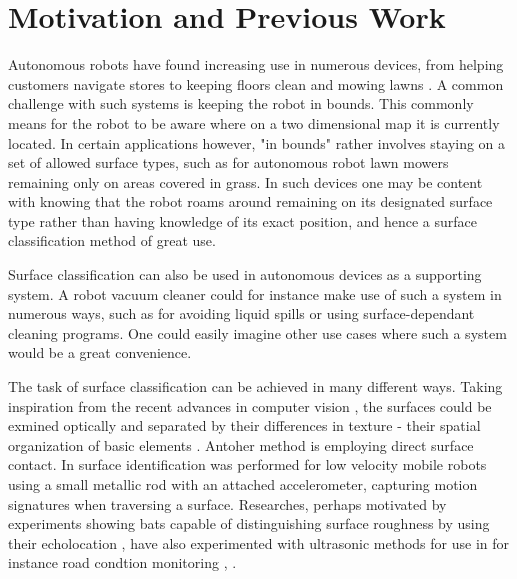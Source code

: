 \section{Motivation and Previous Work}

Autonomous robots have found increasing use in numerous devices, from helping customers navigate stores \citep{mcsweeney_2018} to keeping floors clean \citep{sanfacon_2017} and mowing lawns \citep{udelhofen_2018}. A common challenge with such systems is keeping the robot in bounds. This commonly means for the robot to be aware where on a two dimensional map it is currently located. In certain applications however, "in bounds" rather involves staying on a set of allowed surface types, such as for autonomous robot lawn mowers remaining only on areas covered in grass. In such devices one may be content with knowing that the robot roams around remaining on its designated surface type rather than having knowledge of its exact position, and hence a surface classification method of great use. 

Surface classification can also be used in autonomous devices as a supporting system. A robot vacuum cleaner could for instance make use of such a system in numerous ways, such as for avoiding liquid spills or using surface-dependant cleaning programs. One could easily imagine other use cases where such a system would be a great convenience.

The task of surface classification can be achieved in many different ways. Taking inspiration from the recent advances in computer vision \citep{liu_chen_fieguth_zhao_chellappa_pietikainen_2018}, the surfaces could be exmined optically and separated by their differences in texture - their spatial organization of basic elements \citep{do_vetterli_2002}. Antoher method is employing direct surface contact. In \citep{giguere_dudek_2011} surface identification was performed for low velocity mobile robots using a small metallic rod with an attached accelerometer, capturing motion signatures when traversing a surface. Researches, perhaps motivated by experiments showing bats capable of distinguishing surface roughness by using their echolocation \citep{schmidt_1988}, have also experimented with ultrasonic methods for use in for instance road condtion monitoring \citep{bystrov_2016}, \citep{mckerrow_kristiansen_2006}. 

